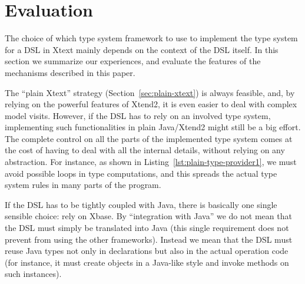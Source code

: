 \section{Evaluation}
\label{sec:evaluation}




The choice of which type system framework to use to implement the type system
for a DSL in Xtext mainly depends on the context of the DSL itself.  In this
section we summarize our experiences, and evaluate the features of the
mechanisms described in this paper.

The ``plain Xtext'' strategy (Section~\ref{sec:plain-xtext}) is always feasible,
and, by relying on the powerful features of Xtend2, it is even easier to deal
with complex model visits.  However, if the DSL has to rely on an involved type
system, implementing such functionalities in plain Java/Xtend2 might still be a
big effort.  The complete control on all the parts of the implemented type
system comes at the cost of having to deal with all the internal details,
without relying on any abstraction.  For instance, as shown in
Listing~\ref{lst:plain-type-provider1}, we must avoid possible loops in type
computations, and this spreads the actual type system rules in many parts of the
program.

If the DSL has to be tightly coupled with Java, there is basically one single
sensible choice: rely on Xbase.  By ``integration with Java'' we do not mean
that the DSL must simply be translated into Java (this single requirement does not
prevent from using the other frameworks).  Instead we mean that the DSL must
reuse Java types not only in declarations but also in the actual operation code
(for instance, it must create objects in a Java-like style and invoke methods on
such instances).

